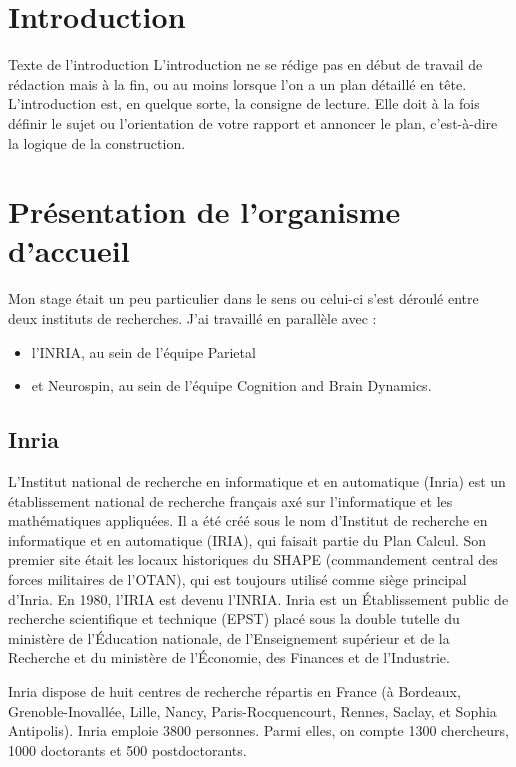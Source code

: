 \chapter*{Introduction}

Texte de l'introduction
L’introduction ne se rédige pas en début de travail de rédaction mais à la fin, ou au moins lorsque l’on a un plan détaillé en tête.
L’introduction est, en quelque sorte, la consigne de lecture. Elle doit à la fois définir le sujet ou l’orientation de votre rapport et annoncer le plan, c’est-à-dire la logique de la construction.


\chapter*{Présentation de l’organisme d’accueil}

Mon stage était un peu particulier dans le sens ou celui-ci s’est déroulé entre deux instituts de recherches. J’ai travaillé en parallèle avec :
\begin{itemize}
    \item l’INRIA, au sein de l’équipe Parietal
    \item et Neurospin, au sein de l’équipe Cognition and Brain Dynamics.
\end{itemize} 

\section{Inria}

L'Institut national de recherche en informatique et en automatique (Inria) est un établissement national de recherche français axé sur l'informatique et les mathématiques appliquées. Il a été créé sous le nom d'Institut de recherche en informatique et en automatique (IRIA), qui faisait partie du Plan Calcul. Son premier site était les locaux historiques du SHAPE (commandement central des forces militaires de l'OTAN), qui est toujours utilisé comme siège principal d'Inria. En 1980, l'IRIA est devenu l'INRIA.
Inria est un Établissement public de recherche scientifique et technique (EPST) placé sous la double tutelle du ministère de l'Éducation nationale, de l'Enseignement supérieur et de la Recherche et du ministère de l'Économie, des Finances et de l'Industrie.
 
Inria dispose de huit centres de recherche répartis en France (à Bordeaux, Grenoble-Inovallée, Lille, Nancy, Paris-Rocquencourt, Rennes, Saclay, et Sophia Antipolis). Inria emploie 3800 personnes. Parmi elles, on compte 1300 chercheurs, 1000 doctorants et 500 postdoctorants.

